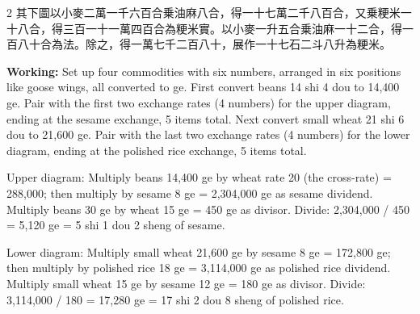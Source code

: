 \documentclass[11pt,a4paper]{article}
\newcommand{\WorkingEn}[1]{\par\noindent\textbf{Working:} #1\par}
\begin{document}
\begin{paracol}{2}
{其下圖以小麥二萬一千六百合乗油麻八合，得一十七萬二千八百合，又乗粳米一十八合，得三百一十一萬四百合為粳米實。以小麥一升五合乗油麻一十二合，得一百八十合為法。除之，得一萬七千二百八十，展作一十七石二斗八升為粳米。}
\switchcolumn
\WorkingEn{Set up four commodities with six numbers, arranged in six positions like goose wings, all converted to ge. First convert beans 14 shi 4 dou to 14,400 ge. Pair with the first two exchange rates (4 numbers) for the upper diagram, ending at the sesame exchange, 5 items total. Next convert small wheat 21 shi 6 dou to 21,600 ge. Pair with the last two exchange rates (4 numbers) for the lower diagram, ending at the polished rice exchange, 5 items total.

Upper diagram: Multiply beans 14,400 ge by wheat rate 20 (the cross-rate) = 288,000; then multiply by sesame 8 ge = 2,304,000 ge as sesame dividend. Multiply beans 30 ge by wheat 15 ge = 450 ge as divisor. Divide: 2,304,000 / 450 = 5,120 ge = 5 shi 1 dou 2 sheng of sesame.

Lower diagram: Multiply small wheat 21,600 ge by sesame 8 ge = 172,800 ge; then multiply by polished rice 18 ge = 3,114,000 ge as polished rice dividend. Multiply small wheat 15 ge by sesame 12 ge = 180 ge as divisor. Divide: 3,114,000 / 180 = 17,280 ge = 17 shi 2 dou 8 sheng of polished rice.}

\end{paracol}
\end{document}
